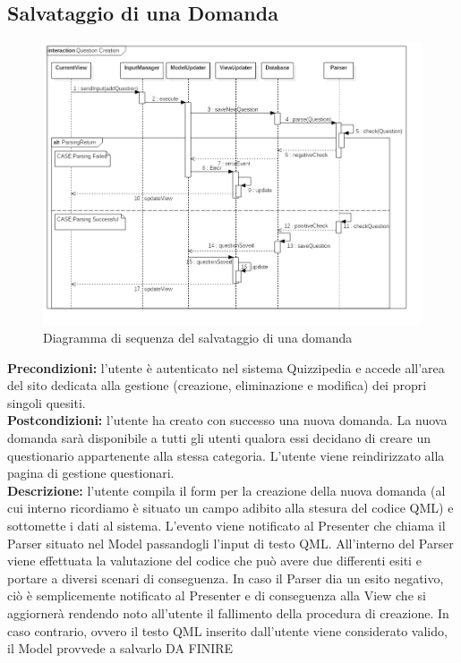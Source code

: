 \documentclass[a4paper,11pt]{article}
\begin{document}
	\subsection{Salvataggio di una Domanda}
	\begin{figure}[h!]
	\begin{center}
		\includegraphics[scale=0.5]{../images/QuestionSaving.png}
		\caption{Diagramma di sequenza del salvataggio di una domanda}
	\end{center}
	\end{figure}
	\textbf{Precondizioni:} l'utente è autenticato nel sistema Quizzipedia e accede all'area del sito dedicata alla gestione (creazione, eliminazione e modifica) dei propri singoli quesiti.\\
	\textbf{Postcondizioni:} l'utente ha creato con successo una nuova domanda. La nuova domanda sarà disponibile a tutti gli utenti qualora essi decidano di creare un questionario appartenente alla stessa categoria. L'utente viene reindirizzato alla pagina di gestione questionari.\\
	\textbf{Descrizione:} l'utente compila il form per la creazione della nuova domanda (al cui interno ricordiamo è situato un campo adibito alla stesura del codice QML) e sottomette i dati al sistema. L'evento viene notificato al Presenter che chiama il Parser situato nel Model passandogli l'input di testo QML. All'interno del Parser viene effettuata la valutazione del codice che può avere due differenti esiti e portare a diversi scenari di conseguenza. In caso il Parser dia un esito negativo, ciò è semplicemente notificato al Presenter e di conseguenza alla View che si aggiornerà rendendo noto all'utente il fallimento della procedura di creazione. In caso contrario, ovvero il testo QML inserito dall'utente viene considerato valido, il Model provvede a salvarlo DA FINIRE\\
	\newpage
\end{document}
